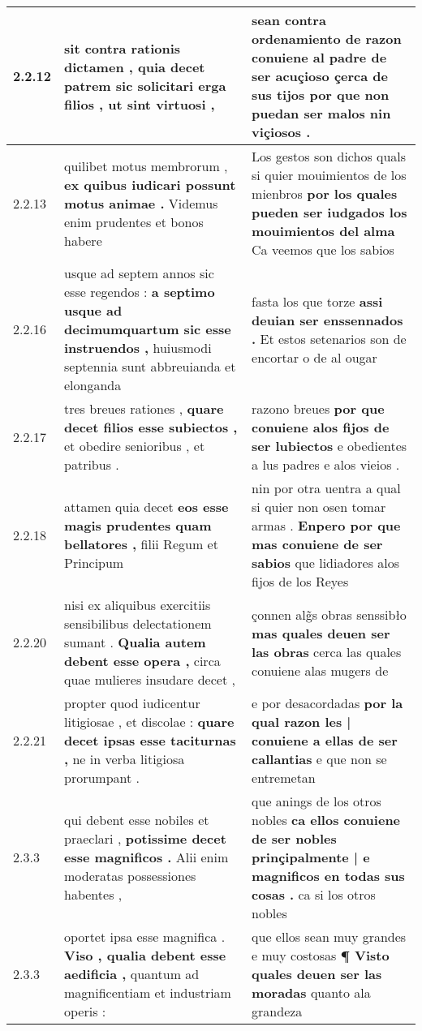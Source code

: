 \begin{tabular}{|p{1cm}|p{6.5cm}|p{6.5cm}|}
2.2.12 & sit contra rationis dictamen , \textbf{ quia decet patrem sic solicitari erga filios , } ut sint virtuosi , & sean contra ordenamiento de \textbf{ razon conuiene al padre de ser acuçioso çerca de sus tijos } por que non puedan ser malos nin viçiosos . \\\hline
2.2.13 & quilibet motus membrorum , \textbf{ ex quibus iudicari possunt motus animae . } Videmus enim prudentes et bonos habere & Los gestos son dichos quals si quier mouimientos de los mienbros \textbf{ por los quales pueden ser iudgados los mouimientos del alma } Ca veemos que los sabios \\\hline
2.2.16 & usque ad septem annos sic esse regendos : \textbf{ a septimo usque ad decimumquartum sic esse instruendos , } huiusmodi septennia sunt abbreuianda et elonganda & fasta los que torze \textbf{ assi deuian ser enssennados . } Et estos setenarios son de encortar o de al ougar \\\hline
2.2.17 & tres breues rationes , \textbf{ quare decet filios esse subiectos , } et obedire senioribus , et patribus . & razono breues \textbf{ por que conuiene alos fijos de ser lubiectos } e obedientes a lus padres e alos vieios . \\\hline
2.2.18 & attamen quia decet \textbf{ eos esse magis prudentes quam bellatores , } filii Regum et Principum & nin por otra uentra a qual si quier non osen tomar armas . \textbf{ Enpero por que mas conuiene de ser sabios } que lidiadores alos fijos de los Reyes \\\hline
2.2.20 & nisi ex aliquibus exercitiis sensibilibus delectationem sumant . \textbf{ Qualia autem debent esse opera , } circa quae mulieres insudare decet , & çonnen alg̃s obras senssibło \textbf{ mas quales deuen ser las obras } cerca las quales conuiene alas mugers de \\\hline
2.2.21 & propter quod iudicentur litigiosae , et discolae : \textbf{ quare decet ipsas esse taciturnas , } ne in verba litigiosa prorumpant . & e por desacordadas \textbf{ por la qual razon les | conuiene a ellas de ser callantias } e que non se entremetan \\\hline
2.3.3 & qui debent esse nobiles et praeclari , \textbf{ potissime decet esse magnificos . } Alii enim moderatas possessiones habentes , & que anings de los otros nobles \textbf{ ca ellos conuiene de ser nobles prinçipalmente | e magnificos en todas sus cosas . } ca si los otros nobles \\\hline
2.3.3 & oportet ipsa esse magnifica . \textbf{ Viso , qualia debent esse aedificia , } quantum ad magnificentiam et industriam operis : & que ellos sean muy grandes e muy costosas \textbf{ ¶ Visto quales deuen ser las moradas } quanto ala grandeza \\\hline

\end{tabular}
